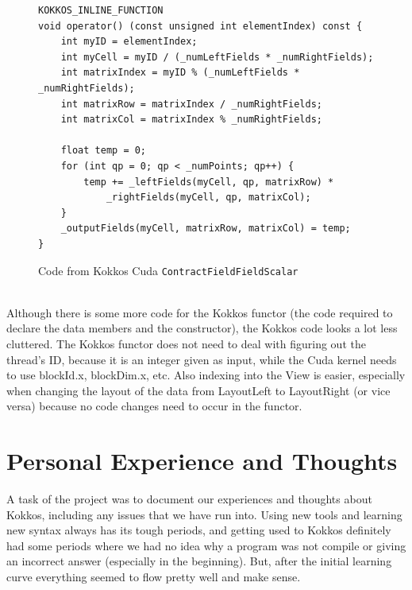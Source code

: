 \begin{figure}[htb]
	\begin{lstlisting}
KOKKOS_INLINE_FUNCTION
void operator() (const unsigned int elementIndex) const {
	int myID = elementIndex;
	int myCell = myID / (_numLeftFields * _numRightFields);
	int matrixIndex = myID % (_numLeftFields * _numRightFields);
	int matrixRow = matrixIndex / _numRightFields;
	int matrixCol = matrixIndex % _numRightFields;

	float temp = 0;
	for (int qp = 0; qp < _numPoints; qp++) {
		temp += _leftFields(myCell, qp, matrixRow) *
			_rightFields(myCell, qp, matrixCol);
	}
	_outputFields(myCell, matrixRow, matrixCol) = temp;
}
	\end{lstlisting}
\caption{Code from Kokkos Cuda \texttt{ContractFieldFieldScalar}
\label{lst:ContractFieldFieldScalar Kokkos Cuda functor}}
\end{figure}
\\
Although there is some more code for the Kokkos functor (the code required to
declare the data members and the constructor), the Kokkos code looks a lot less
cluttered. The Kokkos functor does not need to deal with figuring out the
thread's ID, because it is an integer given as input, while the Cuda kernel
needs to use blockId.x, blockDim.x, etc. Also indexing into the View is easier,
especially when changing the layout of the data from LayoutLeft to LayoutRight
(or vice versa) because no code changes need to occur in the functor.



\section{Personal Experience and Thoughts}
% 
A task of the project was to document our experiences and thoughts about Kokkos, including any issues that we have run into. Using new tools and learning new syntax always has its tough periods, and getting used to Kokkos definitely had some periods where we had no idea why a program was not compile or giving an incorrect answer (especially in the beginning). But, after the initial learning curve everything seemed to flow pretty well and make sense. 

